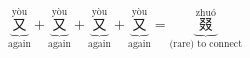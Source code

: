 \[ \underbrace{\overset{\text{yòu}}{\text{又}}}_{\text{again}} + \underbrace{\overset{\text{yòu}}{\text{又}}}_{\text{again}} + \underbrace{\overset{\text{yòu}}{\text{又}}}_{\text{again}} + \underbrace{\overset{\text{yòu}}{\text{又}}}_{\text{again}} = \underbrace{\overset{\text{zhuó}}{\text{叕}}}_{\text{(rare) to connect}} \]
